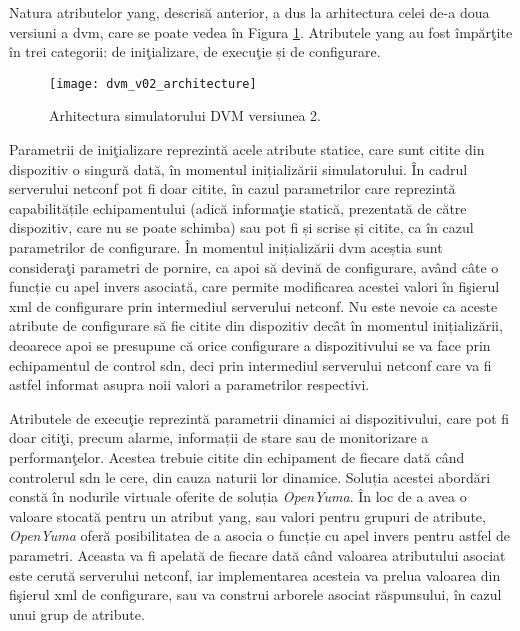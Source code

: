 Natura atributelor \gls{yang}, descrisă anterior, a dus la arhitectura celei de-a doua versiuni a \gls{dvm}, care se poate vedea în Figura \ref{fig:dvm_v02_architecture}. Atributele \gls{yang} au fost împărţite în trei categorii: de iniţializare, de execuţie și de configurare.

\begin{figure}[h]
	\centering
	\texttt{[image: dvm\_v02\_architecture]}
	\caption{Arhitectura simulatorului DVM versiunea 2.}
	\label{fig:dvm_v02_architecture}
\end{figure}

Parametrii de iniţializare reprezintă acele atribute statice, care sunt citite din dispozitiv o singură dată, în momentul inițializării simulatorului. În cadrul serverului \gls{netconf} pot fi doar citite, în cazul parametrilor care reprezintă capabilitățile echipamentului (adică informaţie statică, prezentată de către dispozitiv, care nu se poate schimba) sau pot fi și scrise și citite, ca în cazul parametrilor de configurare. În momentul inițializării \gls{dvm} aceștia sunt consideraţi parametri de pornire, ca apoi să devină de configurare, având câte o funcție cu apel invers asociată, care permite modificarea acestei valori în fişierul \gls{xml} de configurare prin intermediul serverului \gls{netconf}. Nu este nevoie ca aceste atribute de configurare să fie citite din dispozitiv decât în momentul inițializării, deoarece apoi se presupune că orice configurare a dispozitivului se va face prin echipamentul de control \gls{sdn}, deci prin intermediul serverului \gls{netconf} care va fi astfel informat asupra noii valori a parametrilor respectivi.

Atributele de execuţie reprezintă parametrii dinamici ai dispozitivului, care pot fi doar citiţi, precum alarme, informații de stare sau de monitorizare a performanţelor. Acestea trebuie citite din echipament de fiecare dată când controlerul \gls{sdn} le cere, din cauza naturii lor dinamice. Soluția acestei abordări constă în nodurile virtuale oferite de soluția \textit{OpenYuma}. În loc de a avea o valoare stocată pentru un atribut \gls{yang}, sau valori pentru grupuri de atribute, \textit{OpenYuma} oferă posibilitatea de a asocia o funcție cu apel invers pentru astfel de parametri. Aceasta va fi apelată de fiecare dată când valoarea atributului asociat este cerută serverului \gls{netconf}, iar implementarea acesteia va prelua valoarea din fişierul \gls{xml} de configurare, sau va construi arborele asociat răspunsului, în cazul unui grup de atribute.


